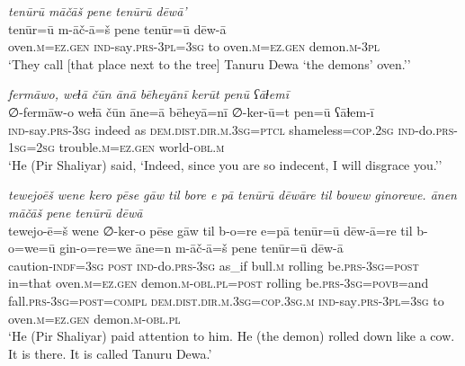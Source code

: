 \ea \label{ŽP.196}
\textit{tenūrū māčāš pene tenūrū dēwā’} \\ 
\gll tenūr=ū m-āč-ā=š pene tenūr=ū dēw-ā \\ 
 oven\textsc{.m}\textsc{\textsc{=ez.gen}} \textsc{ind-}say\textsc{.prs}\textsc{-3pl}\textsc{=3sg} to oven\textsc{.m}\textsc{\textsc{=ez.gen}} demon\textsc{.m}\textsc{-3pl} \\ 
\glt `They call [that place next to the tree] Tanuru Dewa ‘the demons’ oven.’'
\z 
 
\ea \label{ŽP.198}
\textit{fermāwo, weɫā čūn ānā bēheyānī kerūt penū ʕāɫemī} \\ 
\gll ∅-fermāw-o weɫā čūn āne=ā bēheyā=nī ∅-ker-ū=t pen=ū ʕāɫem-ī \\ 
 \textsc{ind-}say\textsc{.prs}\textsc{-3sg} indeed as \textsc{dem.dist}\textsc{.dir}\textsc{.m}\textsc{.3sg}=\textsc{ptcl} shameless\textsc{=cop}\textsc{.\textsc{2sg}} \textsc{ind-}do\textsc{.prs}\textsc{-\textsc{1sg}}\textsc{=\textsc{2sg}} trouble\textsc{.m}\textsc{\textsc{=ez.gen}} world\textsc{-obl}\textsc{.m} \\ 
\glt `He (Pir Shaliyar) said, ‘Indeed, since you are so indecent, I will disgrace you.’'
\z 
 
\ea \label{ŽP.200}
\textit{tewejoēš wene kero pēse gāw til bore e pā tenūrū dēwāre til bowew ginorewe. ānen māčāš pene tenūrū dēwā} \\ 
\gll tewejo-ē=š wene ∅-ker-o pēse gāw til b-o=re e=pā tenūr=ū dēw-ā=re til b-o=we=ū gin-o=re=we āne=n m-āč-ā=š pene tenūr=ū dēw-ā \\ 
 caution\textsc{-indf}\textsc{=3sg} \textsc{post} \textsc{ind-}do\textsc{.prs}\textsc{-3sg} as\_if bull\textsc{.m} rolling be\textsc{.prs}\textsc{-3sg}\textsc{=\textsc{post}} in=that oven\textsc{.m}\textsc{\textsc{=ez.gen}} demon\textsc{.m}\textsc{-obl}\textsc{.pl}\textsc{=\textsc{post}} rolling be\textsc{.prs}\textsc{-3sg}\textsc{=\textsc{povb}}=and fall\textsc{.prs}\textsc{-3sg}\textsc{=\textsc{post}}\textsc{=compl} \textsc{dem.dist}\textsc{.dir}\textsc{.m}\textsc{.3sg}\textsc{=cop}\textsc{.3sg}\textsc{.m} \textsc{ind-}say\textsc{.prs}\textsc{-3pl}\textsc{=3sg} to oven\textsc{.m}\textsc{\textsc{=ez.gen}} demon\textsc{.m}\textsc{-obl}\textsc{.pl} \\ 
\glt `He (Pir Shaliyar) paid attention to him. He (the demon) rolled down like a cow. It is there. It is called Tanuru Dewa.'
\z 
 
